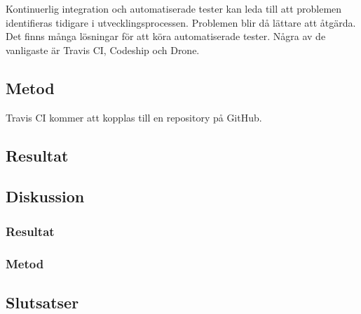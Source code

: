 Kontinuerlig integration och automatiserade tester kan leda till att problemen identifieras tidigare i utvecklingsprocessen. Problemen blir då lättare att åtgärda.\\

Det finns många lösningar för att köra automatiserade tester. Några av de vanligaste är Travis CI, Codeship och Drone.\\

\subsection{Metod}
Travis CI kommer att kopplas till en repository på GitHub.

\subsection{Resultat}
\subsection{Diskussion}
\subsubsection{Resultat}
\subsubsection{Metod}
\subsection{Slutsatser}
